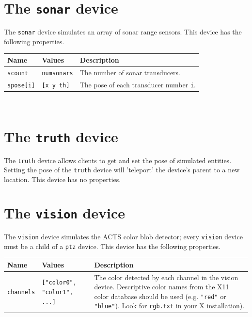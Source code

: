 \documentclass[11pt,twoside]{report}
\begin{document}
\newpage
\section{The {\tt sonar} device}

The {\tt sonar} device simulates an array of sonar range sensors.
This device has the following properties.
\vspace{1em}\\\noindent
\begin{tabularx}{\columnwidth}{llX}
\hline
Name & Values & Description \\
\hline

\verb'scount' & \verb'numsonars' & The number of sonar transducers.\\

\verb'spose[i]' & \verb'[x y th]' & The pose of each transducer number {\tt i}.\\

\hline
\end{tabularx}
\vspace{1em}\\


\newpage
\section{The {\tt truth} device}

The {\tt truth} device allows clients to get and set the pose of
simulated entities.  Setting the pose of the {\tt truth} device will
'teleport' the device's parent to a new location.
This device has no properties.


\newpage
\section{The {\tt vision} device}

The {\tt vision} device simulates the ACTS color blob detector; every
{\tt vision} device must be a child of a {\tt ptz} device.
This device has the following properties.
\vspace{1em}\\\noindent
\begin{tabularx}{\columnwidth}{llX}
\hline
Name & Values & Description \\
\hline

\verb'channels' & \verb'["color0", "color1", ...]' & The
color detected by each channel in the vision device.  Descriptive
color names from the X11 color database should be used
(e.g. \verb'"red"' or \verb'"blue"').  Look for \verb'rgb.txt' in your
X installation).\\

\hline
\end{tabularx}
\vspace{1em}\\




\end{document}
